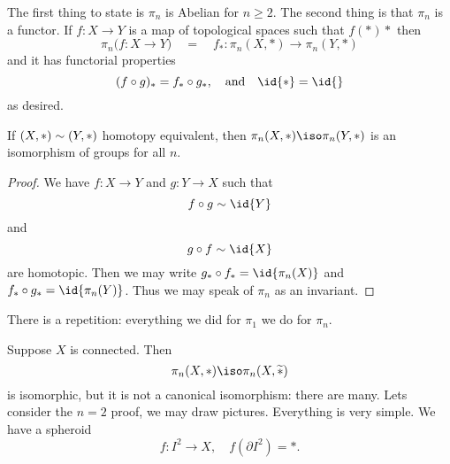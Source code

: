 The first thing to state is $\pi_{n}$ is Abelian for
$n\geq2$. The second thing is that $\pi_{n}$ is a functor. If
$f\colon X\to Y$ is a map of topological spaces such that $f(*)*$
then 
\begin{equation}
\pi_{n}\bigl(f\colon X\to Y\bigr)\quad=\quad
f_{*}\colon\pi_{n}(X,*)\to\pi_{n}(Y,*) 
\end{equation}
and it has functorial properties
\begin{equation}
(f\circ g)_{*}=f_{*}\circ g_{*},\quad\mbox{and}\quad\id{*}=\id{}
\end{equation}
as desired.

\begin{thm}
If $(X,*)\sim(Y,*)$ homotopy equivalent, then
$\pi_{n}(X,*)\iso\pi_{n}(Y,*)$ is an isomorphism of groups for
all $n$.
\end{thm}
\begin{proof}
We have $f\colon X\to Y$ and $g\colon Y\to X$ such that
\begin{equation}
f\circ g\homotopic\id{Y}
\end{equation}
and
\begin{equation}
g\circ f\homotopic\id{X}
\end{equation}
are homotopic. Then we may write $g_{*}\circ
f_{*}=\id{\pi_{n}(X)}$ and $f_{*}\circ
g_{*}=\id{\pi_{n}(Y)}$. Thus we may speak of $\pi_{n}$ as an invariant.
\end{proof}
There is a repetition: everything we did for $\pi_{1}$ we do for $\pi_{n}$.

Suppose $X$ is connected. Then
\begin{equation}
\pi_{n}(X,*)\iso\pi_{n}(X,\widetilde{*})
\end{equation}
is isomorphic, but it is not a canonical isomorphism: there are
many. Lets consider the $n=2$ proof, we may draw
pictures. Everything is very simple. We have a spheroid
\begin{equation}
f\colon I^2\to X,\quad f(\partial I^2)=*.
\end{equation}

